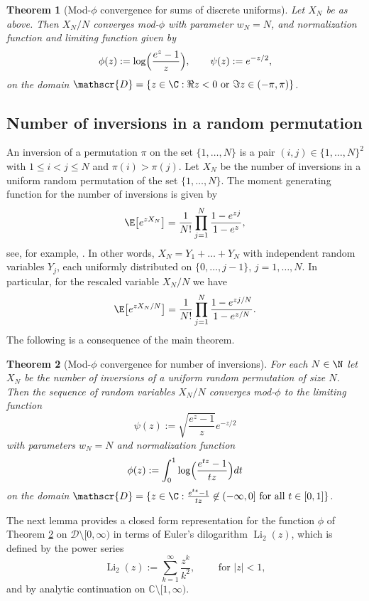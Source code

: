 \documentclass[11pt,a4paper]{scrartcl}
\numberwithin{equation}{section}
\theoremstyle{plain}
\newtheorem{theorem}{Theorem}[section]
\theoremstyle{definition}
\theoremstyle{remark}
\begin{document}
\begin{theorem}[Mod-$\phi$ convergence for sums of discrete uniforms]\label{thm: mod_phi_uniform_sum}
Let $X_N$ be as above. Then $X_N/N$ converges mod-$\phi$ with parameter $w_N=N$, and normalization function and limiting function given by
\[
\phi(z):=\log\Bigl(\frac{e^{z}-1}{z}\Bigr),\qquad \psi(z):=e^{-z/2},
\]
on the domain $\mathscr{D} = \{z\in \C: \Re z < 0 \text{ or } \Im z \in (-\pi, \pi)\}$.
\end{theorem}


\subsection{Number of inversions in a random permutation}

An inversion of a permutation $\pi$ on the set $\{1,\ldots,N\}$ is a pair $(i,j)\in\{1,\ldots,N\}^2$ with $1\le i < j \le N$ and $\pi(i) > \pi(j)$. Let $X_N$ be the number of inversions in a uniform random permutation of the set $\{1,\ldots,N\}$. The moment generating function for the number of inversions is given by
\[ 
\E\big[e^{z X_N}\big] = \frac{1}{N!}\prod_{j=1}^N \frac{1-e^{zj}}{1-e^z},
\]
see, for example, \cite{heerten2024probabilistic}.  In other words, $X_N=Y_1+\ldots+Y_N$ with independent random variables $Y_j$, each uniformly distributed on $\{0,\ldots,j-1\}$, $j=1,\ldots,N$. In particular, for the rescaled variable $X_N/N$ we have
\[ 
\E\big[e^{z X_N/N}\big] = \frac{1}{N!}\prod_{j=1}^N \frac{1-e^{zj/N}}{1-e^{z/N}}.
\]
The following is a consequence of the main theorem.

\begin{theorem}[Mod-$\phi$ convergence for number of inversions]\label{thm: mod_phi_convergence_inversions}
	For each $N\in\N$ let $X_N$ be the number of inversions of a uniform random permutation of size $N$. Then the sequence of random variables $X_N/N$ converges mod-$\phi$ to the limiting function
	\[
	\psi(z) := \sqrt{\frac{e^z-1}{z}}e^{-z/2}
	\]
	with parameters $w_N=N$ and normalization function
	\[
	\phi(z) := \int_0^1 \log\Bigl(\frac{e^{tz}-1}{{tz}}\Bigr)dt
	\]
	on the domain $\mathscr{D} = \{z\in \C: \frac{e^{tz}-1}{{tz}}\not\in (-\infty, 0] \text{ for all } t\in [0,1]\}$.
\end{theorem}

The next lemma provides a closed form representation for the function $\phi$ of Theorem \ref{thm: mod_phi_convergence_inversions} on $\mathscr{D}\setminus [0,\infty)$ in terms of Euler's dilogarithm $\operatorname{Li}_2(z)$, which is defined by the power series
$$
\operatorname{Li}_2(z) := \sum_{k=1}^{\infty} \frac{z^k}{k^2}, \qquad \text{ for } |z| < 1,
$$
and by analytic continuation on $\mathbb{C} \setminus [1,\infty)$.
\end{document}
